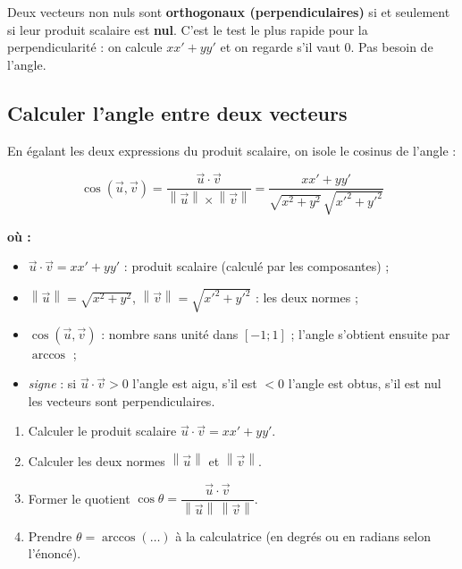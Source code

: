 \documentclass[11pt,a4paper]{article}
\newenvironment{ou}{%
  \par\smallskip\noindent\textbf{où :}\nopagebreak
  \begin{itemize}[leftmargin=1.8em,topsep=2pt,itemsep=1.5pt,parsep=0pt]}%
  {\end{itemize}}
\providecommand{\norm}[1]{\left\lVert #1\right\rVert}
\begin{document}
\begin{attention}
Deux vecteurs non nuls sont \textbf{orthogonaux (perpendiculaires)} si et seulement si leur produit
scalaire est \textbf{nul}. C'est le test le plus rapide pour la perpendicularité : on calcule
$x x'+y y'$ et on regarde s'il vaut $0$. Pas besoin de l'angle.
\end{attention}

\subsection{Calculer l'angle entre deux vecteurs}

En égalant les deux expressions du produit scalaire, on isole le cosinus de l'angle :

\begin{formule}
\[
  \boxed{\;\cos(\vec{u},\vec{v})=\dfrac{\vec{u}\cdot\vec{v}}{\norm{\vec{u}}\times\norm{\vec{v}}}
  =\dfrac{x x'+y y'}{\sqrt{x^2+y^2}\,\sqrt{x'^2+y'^2}}\;}
\]
\begin{ou}
  \item $\vec{u}\cdot\vec{v}=x x'+y y'$ : produit scalaire (calculé par les composantes) ;
  \item $\norm{\vec{u}}=\sqrt{x^2+y^2}$, $\norm{\vec{v}}=\sqrt{x'^2+y'^2}$ : les deux normes ;
  \item $\cos(\vec{u},\vec{v})$ : nombre sans unité dans $[-1;1]$ ; l'angle s'obtient ensuite par
        $\arccos$ ;
  \item \emph{signe} : si $\vec{u}\cdot\vec{v}>0$ l'angle est aigu, s'il est $<0$ l'angle est obtus,
        s'il est nul les vecteurs sont perpendiculaires.
\end{ou}
\end{formule}

\begin{methode}
\begin{enumerate}[leftmargin=1.8em,topsep=2pt,itemsep=2pt]
  \item Calculer le produit scalaire $\vec{u}\cdot\vec{v}=x x'+y y'$.
  \item Calculer les deux normes $\norm{\vec{u}}$ et $\norm{\vec{v}}$.
  \item Former le quotient $\cos\theta=\dfrac{\vec{u}\cdot\vec{v}}{\norm{\vec{u}}\,\norm{\vec{v}}}$.
  \item Prendre $\theta=\arccos(\ldots)$ à la calculatrice (en degrés ou en radians selon l'énoncé).
\end{enumerate}
\end{methode}
\end{document}
